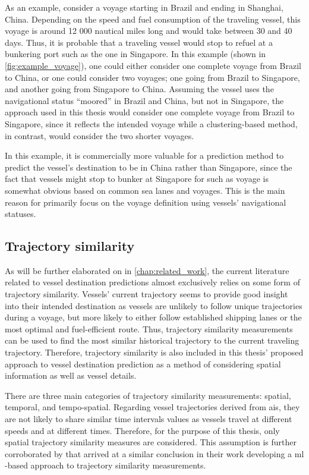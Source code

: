 As an example, consider a voyage starting in Brazil and ending in Shanghai, China. Depending on the speed and fuel consumption of the traveling vessel, this voyage is around 12 000 nautical miles long and would take between 30 and 40 days. Thus, it is probable that a traveling vessel would stop to refuel at a bunkering port such as the one in Singapore. In this example (shown in \cref{fig:example_voyage}), one could either consider one complete voyage from Brazil to China, or one could consider two voyages; one going from Brazil to Singapore, and another going from Singapore to China. Assuming the vessel uses the navigational status ``moored'' in Brazil and China, but not in Singapore, the approach used in this thesis would consider one complete voyage from Brazil to Singapore, since it reflects the intended voyage while a clustering-based method, in contrast, would consider the two shorter voyages.

In this example, it is commercially more valuable for a prediction method to predict the vessel's destination to be in China rather than Singapore, since the fact that vessels might stop to bunker at Singapore for such as voyage is somewhat obvious based on common sea lanes and voyages. This is the main reason for primarily focus on the voyage definition using vessels' navigational statuses.

\subsection{Trajectory similarity}
\label{sec:trajectory_similarity}

As will be further elaborated on in \cref{chap:related_work}, the current literature related to vessel destination predictions almost exclusively relies on some form of trajectory similarity. Vessels' current trajectory seems to provide good insight into their intended destination as vessels are unlikely to follow unique trajectories during a voyage, but more likely to either follow established shipping lanes or the most optimal and fuel-efficient route. Thus, trajectory similarity measurements can be used to find the most similar historical trajectory to the current traveling trajectory. Therefore, trajectory similarity is also included in this thesis' proposed approach to vessel destination prediction as a method of considering spatial information as well as vessel details.

There are three main categories of trajectory similarity measurements: spatial, temporal, and tempo-spatial. Regarding vessel trajectories derived from \acrshort{ais}, they are not likely to share similar time intervals values as vessels travel at different speeds and at different times. Therefore, for the purpose of this thesis, only spatial trajectory similarity measures are considered. This assumption is further corroborated by \cite{Zhang2020AISApproach} that arrived at a similar conclusion in their work developing a \acrshort{ml} -based approach to trajectory similarity measurements.

